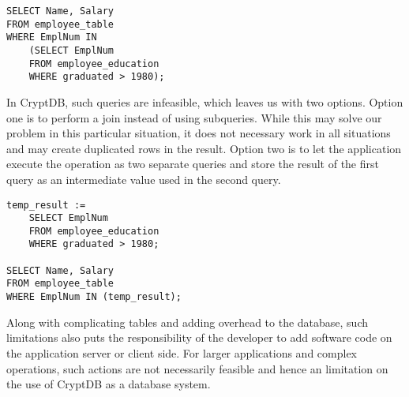 \begin{verbatim}
SELECT Name, Salary
FROM employee_table
WHERE EmplNum IN
    (SELECT EmplNum
    FROM employee_education
    WHERE graduated > 1980);
\end{verbatim}

In CryptDB, such queries are infeasible, which leaves us with two options. Option one is to perform a join instead of using subqueries. While this may solve our problem in this particular situation, it does not necessary work in all situations and may create duplicated rows in the result. Option two is to let the application execute the operation as two separate queries and store the result of the first query as an intermediate value used in the second query.

\begin{verbatim}
temp_result :=
    SELECT EmplNum
    FROM employee_education
    WHERE graduated > 1980;

SELECT Name, Salary
FROM employee_table 
WHERE EmplNum IN (temp_result);
\end{verbatim}


Along with complicating tables and adding overhead to the database, such limitations also puts the responsibility of the developer to add software code on the application server or client side. For larger applications and complex operations, such actions are not necessarily feasible and hence an limitation on the use of CryptDB as a database system.\\